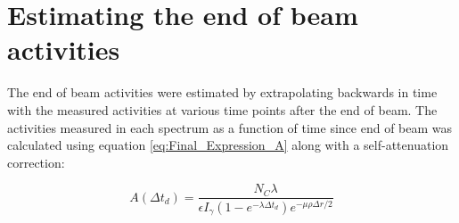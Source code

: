 \section{Estimating the end of beam activities}
The end of beam activities were estimated by extrapolating backwards in time with the measured activities at various time points after the end of beam. The activities measured in each spectrum as a function of time since end of beam was calculated using equation \ref{eq:Final_Expression_A} along with a self-attenuation correction:

\begin{equation} \label{eq:activity_eob_matlab}
    A(\Delta t_d) = \frac{N_C\lambda}{\epsilon I_\gamma (1-e^{-\lambda \Delta t_d})e^{-\mu\rho\Delta r/2}}
\end{equation}


